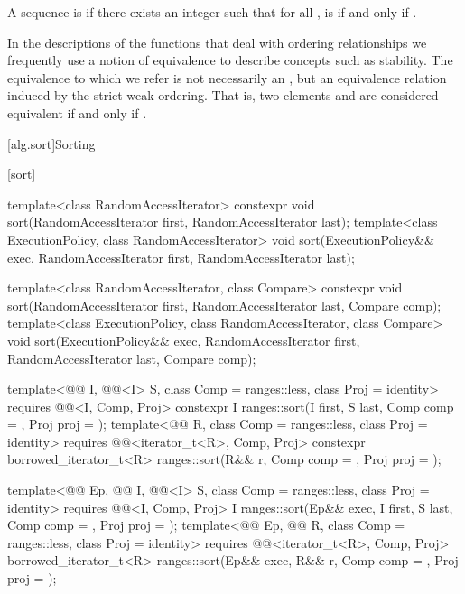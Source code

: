 \pnum
A sequence  is
 
if there exists an integer 
such that for all ,
 is  if and only if .

\pnum
In the descriptions of the functions that deal with ordering relationships
we frequently use a notion of equivalence to describe concepts
such as stability.
The equivalence to which we refer is not necessarily an ,
but an equivalence relation induced by the strict weak ordering.
That is, two elements  and  are considered equivalent
if and only if .

[alg.sort]{Sorting}

[sort]{}

%
\begin{itemdecl}
template<class RandomAccessIterator>
  constexpr void sort(RandomAccessIterator first, RandomAccessIterator last);
template<class ExecutionPolicy, class RandomAccessIterator>
  void sort(ExecutionPolicy&& exec,
            RandomAccessIterator first, RandomAccessIterator last);

template<class RandomAccessIterator, class Compare>
  constexpr void sort(RandomAccessIterator first, RandomAccessIterator last,
                      Compare comp);
template<class ExecutionPolicy, class RandomAccessIterator, class Compare>
  void sort(ExecutionPolicy&& exec,
            RandomAccessIterator first, RandomAccessIterator last,
            Compare comp);

template<@@ I, @@<I> S, class Comp = ranges::less,
         class Proj = identity>
  requires @@<I, Comp, Proj>
  constexpr I
    ranges::sort(I first, S last, Comp comp = {}, Proj proj = {});
template<@@ R, class Comp = ranges::less, class Proj = identity>
  requires @@<iterator_t<R>, Comp, Proj>
  constexpr borrowed_iterator_t<R>
    ranges::sort(R&& r, Comp comp = {}, Proj proj = {});

template<@@ Ep, @@ I, @@<I> S,
         class Comp = ranges::less, class Proj = identity>
  requires @@<I, Comp, Proj>
  I ranges::sort(Ep&& exec, I first, S last, Comp comp = {}, Proj proj = {});
template<@@ Ep, @@ R, class Comp = ranges::less,
         class Proj = identity>
  requires @@<iterator_t<R>, Comp, Proj>
  borrowed_iterator_t<R> ranges::sort(Ep&& exec, R&& r, Comp comp = {}, Proj proj = {});
\end{itemdecl}

